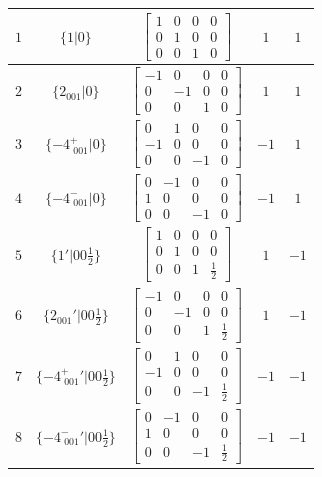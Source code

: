 \documentclass[fleqn,8pt]{jsarticle}
\begin{document}
\begin{longtable}{ccccc}
$ 1 $ & $ \{1|0\} $ & $ \begin{bmatrix} 1 & 0 & 0 & 0 \\ 0 & 1 & 0 & 0 \\ 0 & 0 & 1 & 0 \end{bmatrix} $ & $ 1 $ & $ 1 $ \\ \hline
$ 2 $ & $ \{2{}_{001}|0\} $ & $ \begin{bmatrix} -1 & 0 & 0 & 0 \\ 0 & -1 & 0 & 0 \\ 0 & 0 & 1 & 0 \end{bmatrix} $ & $ 1 $ & $ 1 $ \\ \hline
$ 3 $ & $ \{-4^{+}_{\,\,001}|0\} $ & $ \begin{bmatrix} 0 & 1 & 0 & 0 \\ -1 & 0 & 0 & 0 \\ 0 & 0 & -1 & 0 \end{bmatrix} $ & $ -1 $ & $ 1 $ \\ \hline
$ 4 $ & $ \{-4^{-}_{\,\,001}|0\} $ & $ \begin{bmatrix} 0 & -1 & 0 & 0 \\ 1 & 0 & 0 & 0 \\ 0 & 0 & -1 & 0 \end{bmatrix} $ & $ -1 $ & $ 1 $ \\ \hline
$ 5 $ & $ \{1{}'|0 0 \frac{1}{2}\} $ & $ \begin{bmatrix} 1 & 0 & 0 & 0 \\ 0 & 1 & 0 & 0 \\ 0 & 0 & 1 & \frac{1}{2} \end{bmatrix} $ & $ 1 $ & $ -1 $ \\ \hline
$ 6 $ & $ \{2{}_{001}{}'|0 0 \frac{1}{2}\} $ & $ \begin{bmatrix} -1 & 0 & 0 & 0 \\ 0 & -1 & 0 & 0 \\ 0 & 0 & 1 & \frac{1}{2} \end{bmatrix} $ & $ 1 $ & $ -1 $ \\ \hline
$ 7 $ & $ \{-4^{+}_{\,\,001}{}'|0 0 \frac{1}{2}\} $ & $ \begin{bmatrix} 0 & 1 & 0 & 0 \\ -1 & 0 & 0 & 0 \\ 0 & 0 & -1 & \frac{1}{2} \end{bmatrix} $ & $ -1 $ & $ -1 $ \\ \hline
$ 8 $ & $ \{-4^{-}_{\,\,001}{}'|0 0 \frac{1}{2}\} $ & $ \begin{bmatrix} 0 & -1 & 0 & 0 \\ 1 & 0 & 0 & 0 \\ 0 & 0 & -1 & \frac{1}{2} \end{bmatrix} $ & $ -1 $ & $ -1 $ \\
\end{longtable}
\end{document}
